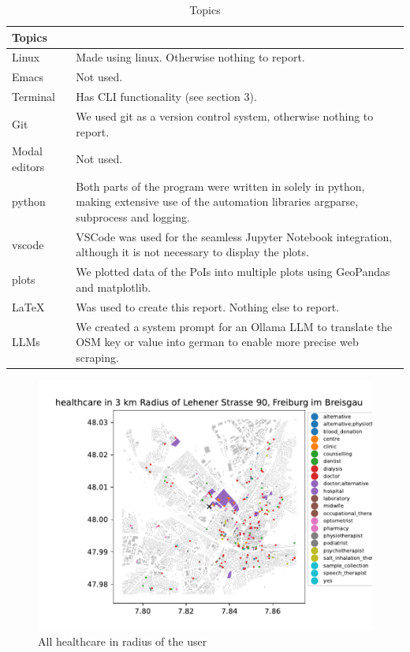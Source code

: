 \documentclass[runningheads]{llncs}
\begin{document}
\begin{table}
\caption{Topics}
\begin{tabularx}{\textwidth}{ l  X }
Topics \\
\hline
Linux & Made using linux. Otherwise nothing to report.\\
Emacs & Not used.\\
Terminal & Has CLI functionality (see section 3). \\
Git & We used git as a version control system, otherwise nothing to report.\\
Modal editors & Not used.\\
python & Both parts of the program were written in solely in python, making extensive use of the automation libraries argparse, subprocess and logging. \\
vscode & VSCode was used for the seamless Jupyter Notebook integration, although it is not necessary to display the plots. \\
plots & We plotted data of the PoIs into multiple plots using GeoPandas and matplotlib. \\
\LaTeX & Was used to create this report. Nothing else to report. \\
LLMs & We created a system prompt for an Ollama LLM to translate the OSM key or value into german to enable more precise web scraping. 
\end{tabularx}
\end{table}

\begin{figure}
\includegraphics[width=\textwidth]{../images/freiburg_healthcare}
\caption{All healthcare in radius of the user} \label{fig1}
\end{figure}
\end{document}
